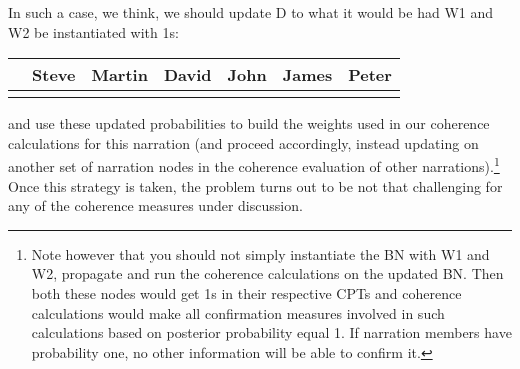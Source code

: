 \documentclass[10pt,]{scrartcl}
\begin{document}
In such a case, we think, we should update \textsf{D} to what it would
be had \textsf{W1} and \textsf{W2} be instantiated with 1s:

\begin{table}[H]
\centering
\begin{tabular}{lrrrrrr}
\toprule
  & Steve & Martin & David & John & James & Peter\\
\midrule
\cellcolor{gray!6}{Pr} & \cellcolor{gray!6}{0.981} & \cellcolor{gray!6}{0.004} & \cellcolor{gray!6}{0.004} & \cellcolor{gray!6}{0.004} & \cellcolor{gray!6}{0.004} & \cellcolor{gray!6}{0.004}\\
\bottomrule
\end{tabular}
\end{table}

\noindent and use these updated probabilities to build the weights used
in our coherence calculations for this narration (and proceed
accordingly, instead updating on another set of narration nodes in the
coherence evaluation of other
narrations).\footnote{Note  however that  you should not simply instantiate the BN with \textsf{W1} and \textsf{W2}, propagate and run the coherence calculations on the updated BN. Then both these nodes would get 1s in their respective CPTs and coherence calculations would make   all  confirmation measures involved in such calculations  based on posterior probability equal 1. If narration members have probability one, no other information will be able to confirm it.}
Once this strategy is taken, the problem turns out to be not that
challenging for any of the coherence measures under discussion.

\begin{table}[H]
\centering
{}
\end{table}
\end{document}

